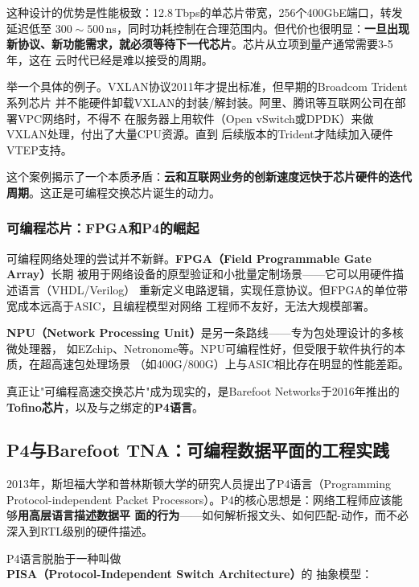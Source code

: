 这种设计的优势是性能极致：12.8\,Tbps的单芯片带宽，256个400GbE端口，转发延迟低至
$300\sim500\,\text{ns}$，同时功耗控制在合理范围内。但代价也很明显：\textbf{一旦出现
新协议、新功能需求，就必须等待下一代芯片}。芯片从立项到量产通常需要3-5年，这在
云时代已经是难以接受的周期。

举一个具体的例子。VXLAN协议2011年才提出标准，但早期的Broadcom Trident系列芯片
并不能硬件卸载VXLAN的封装/解封装。阿里、腾讯等互联网公司在部署VPC网络时，不得不
在服务器上用软件（Open vSwitch或DPDK）来做VXLAN处理，付出了大量CPU资源。直到
后续版本的Trident才陆续加入硬件VTEP支持。

这个案例揭示了一个本质矛盾：\textbf{云和互联网业务的创新速度远快于芯片硬件的迭代
周期}。这正是可编程交换芯片诞生的动力。

\subsubsection{可编程芯片：FPGA和P4的崛起}

可编程网络处理的尝试并不新鲜。\textbf{FPGA（Field Programmable Gate Array）}长期
被用于网络设备的原型验证和小批量定制场景——它可以用硬件描述语言（VHDL/Verilog）
重新定义电路逻辑，实现任意协议。但FPGA的单位带宽成本远高于ASIC，且编程模型对网络
工程师不友好，无法大规模部署。

\textbf{NPU（Network Processing Unit）}是另一条路线——专为包处理设计的多核微处理器，
如EZchip、Netronome等。NPU可编程性好，但受限于软件执行的本质，在超高速包处理场景
（如400G/800G）上与ASIC相比存在明显的性能差距。

真正让"可编程高速交换芯片"成为现实的，是Barefoot Networks于2016年推出的
\textbf{Tofino芯片}，以及与之绑定的\textbf{P4语言}。

\subsection{P4与Barefoot TNA：可编程数据平面的工程实践}

2013年，斯坦福大学和普林斯顿大学的研究人员提出了P4语言（Programming Protocol-independent
Packet Processors）。P4的核心思想是：网络工程师应该能够\textbf{用高层语言描述数据平
面的行为}——如何解析报文头、如何匹配-动作，而不必深入到RTL级别的硬件描述。

P4语言脱胎于一种叫做\textbf{PISA（Protocol-Independent Switch Architecture）}的
抽象模型：

